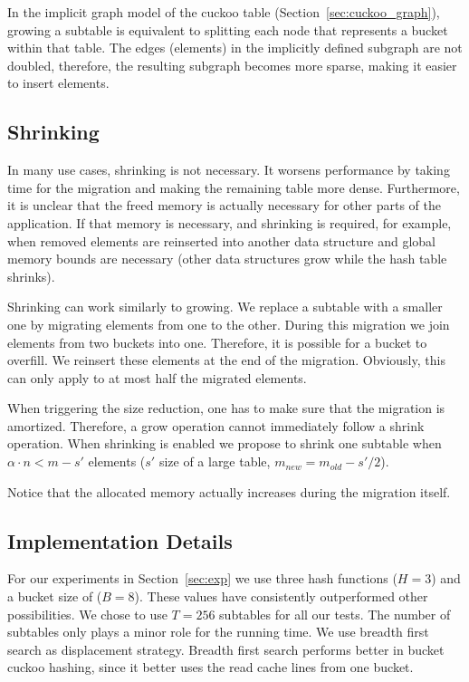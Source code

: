\documentclass[a4paper,UKenglish]{lipics-v2016}
\begin{document}
In the implicit graph model of the cuckoo table
(Section~\ref{sec:cuckoo_graph}), growing a subtable is equivalent to
splitting each node that represents a bucket within that table. The
edges (elements) in the implicitly defined subgraph are not doubled,
therefore, the resulting subgraph becomes more sparse, making it
easier to insert elements.

\subsection{Shrinking}
In many use cases, shrinking is not necessary.  It worsens performance
by taking time for the migration and making the remaining table more
dense.  Furthermore, it is unclear that the freed memory is actually
necessary for other parts of the application.  If that memory is
necessary, and shrinking is required, for example, when removed
elements are reinserted into another data structure and global memory
bounds are necessary (other data structures grow while the hash table
shrinks).

Shrinking can work similarly to growing. We replace a subtable with a
smaller one by migrating elements from one to the other.  During this
migration we join elements from two buckets into one. Therefore, it is
possible for a bucket to overfill.  We reinsert these elements at the
end of the migration.  Obviously, this can only apply to at most half
the migrated elements.

When triggering the size reduction, one has to make sure that the
migration is amortized. Therefore, a grow operation cannot immediately
follow a shrink operation.  When shrinking is enabled we propose to
shrink one subtable when $\alpha\cdot n < m-s'$ elements ($s'$ size of a
large table, $m_{new} = m_{old} -s'/2$).

Notice that the allocated memory actually increases during the
migration itself.

\subsection{Implementation Details}
For our experiments in Section~\ref{sec:exp} we use three hash
functions ($H=3$) and a bucket size of ($B=8$). These values have
consistently outperformed other possibilities.  We chose to use
$T=256$ subtables for all our tests.  The number of subtables only
plays a minor role for the running time.  We use breadth first search
as displacement strategy. Breadth first search performs better in
bucket cuckoo hashing, since it better uses the read cache lines from
one bucket.
\end{document}
